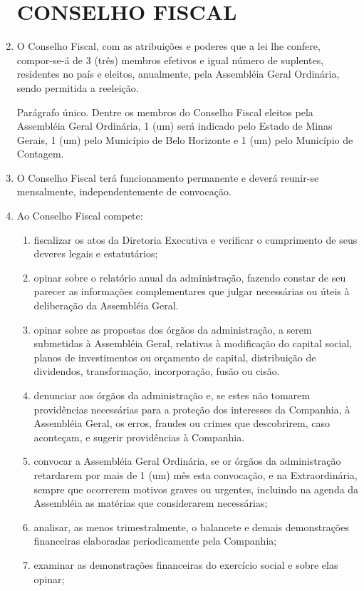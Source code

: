 \documentclass[a4paper,11pt]{report}
\begin{document}
\begin{enumerate}[resume, label=Art. \arabic*]
\section{CONSELHO FISCAL}

\item O Conselho Fiscal, com as atribuições e poderes que a lei lhe confere, compor-se-á de 3 (três) membros efetivos e igual número de suplentes, residentes no país e eleitos, anualmente, pela Assembléia Geral Ordinária, sendo permitida a reeleição.

Parágrafo único. Dentre os membros do Conselho Fiscal eleitos pela Assembléia Geral Ordinária, 1 (um) será indicado pelo Estado de Minas Gerais, 1 (um) pelo Município de Belo Horizonte e 1 (um) pelo Município de Contagem.

\item O Conselho Fiscal terá funcionamento permanente e deverá reunir-se mensalmente, independentemente de convocação.

\item Ao Conselho Fiscal compete:
        \begin{enumerate}[label=\roman*.]
        \item fiscalizar os atos da Diretoria Executiva e verificar o cumprimento de seus deveres legais e estatutários;
        \item opinar sobre o relatório anual da administração, fazendo constar de seu parecer as informações complementares que julgar necessárias ou úteis à deliberação da Assembléia Geral.
        \item opinar sobre as propostas dos órgãos da administração, a serem submetidas à Assembléia Geral, relativas à modificação do capital social, planos de investimentos ou orçamento de capital, distribuição de dividendos, transformação, incorporação, fusão ou cisão.
        \item denunciar aos órgãos da administração e, se estes não tomarem providências necessárias para a proteção dos interesses da Companhia, à Assembléia Geral, os erros, fraudes ou crimes que descobrirem, caso aconteçam, e sugerir providências à Companhia.
        \item convocar a Assembléia Geral Ordinária, se or órgãos da administração retardarem por mais de 1 (um) mês esta convocação, e na Extraordinária, sempre que ocorrerem motivos graves ou urgentes, incluindo na agenda da Assembléia as matérias que considerarem necessárias;
        \item analisar, as menos trimestralmente, o balancete e demais demonstrações financeiras elaboradas periodicamente pela Companhia;
        \item examinar as demonstrações financeiras do exercício social e sobre elas opinar;
        \end{enumerate}


\end{enumerate}
\end{document}
